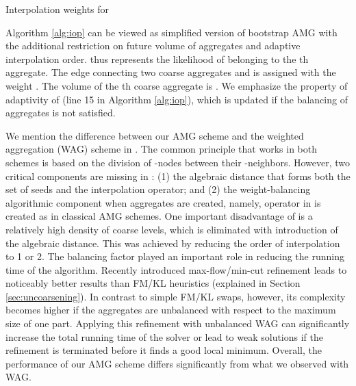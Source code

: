 \documentclass{llncs}
\begin{document}
\vspace*{-.25cm}
\incmargin{1em}
\linesnumbered
\begin{algorithm}
\caption{Interpolation weights for }\label{alg:iop}
\Input{, , }
\BlankLine
\If{}{
\;
}
\end{algorithm}
\vspace*{-.5cm}
\decmargin{1em}
Algorithm \ref{alg:iop} can be viewed as simplified version of bootstrap AMG \cite{bamg-review}  with the additional restriction on future volume of aggregates and adaptive interpolation order.  thus represents the likelihood of  belonging to the th aggregate. The edge connecting two coarse aggregates  and  is assigned with the weight . The volume of the th coarse aggregate is . 
We emphasize the property of adaptivity of  (line 15 in Algorithm \ref{alg:iop}), which is updated if the balancing of aggregates is not satisfied.
\par We mention the difference between our AMG scheme and the weighted aggregation (WAG) scheme in \cite{ChevalierS09}. The common principle that works in both schemes is based on the division of -nodes between their -neighbors.
 However, two critical components are missing in  \cite{ChevalierS09}: (1) the algebraic distance that forms both the set of seeds and the interpolation operator; and (2) the weight-balancing algorithmic component when aggregates  are created, namely, operator  in \cite{ChevalierS09} is created as in classical AMG schemes. 
 One important disadvantage of \cite{ChevalierS09} is a relatively high  density of coarse levels, which is eliminated with introduction of the algebraic distance.
  This was achieved by reducing the order of interpolation to 1 or 2. 
  The balancing factor played an important role in reducing the running time of the algorithm. 
  Recently introduced max-flow/min-cut refinement leads to noticeably better results than FM/KL heuristics (explained in Section \ref{sec:uncoarsening}). In contrast to simple FM/KL swaps, however, its complexity becomes higher if the aggregates are unbalanced with respect to the maximum size of one part. Applying this refinement with unbalanced WAG can significantly increase the total running time of the solver or lead to weak solutions if the refinement is terminated before it finds a good local minimum. Overall, the performance of our AMG scheme differs significantly from what we observed with WAG.
\end{document}
